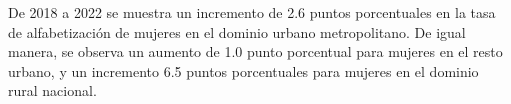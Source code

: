 De 2018 a 2022 se muestra un incremento de 2.6 puntos porcentuales en la tasa de alfabetización de mujeres en el dominio urbano metropolitano. De igual manera, se observa un aumento de 1.0 punto porcentual para mujeres en el resto urbano, y un incremento 6.5 puntos porcentuales para mujeres en el dominio rural nacional. 